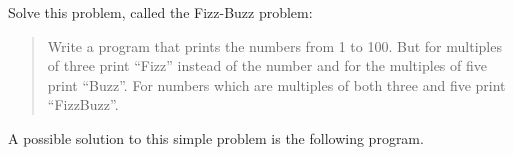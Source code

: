 \begin{Exercise}[title={FizzBuzz},difficulty=0]
\label{ex:fizzbuzz}
\Question \label{ex:fizzbuzz q1} Solve this problem, called
the Fizz-Buzz \cite{fizzbuzz} problem:
\begin{quote}
Write a program that prints the numbers from 1 to 100. But for multiples
of three print ``Fizz'' instead of the number and for the multiples of
five print ``Buzz''. For numbers which are multiples of both three and
five print ``FizzBuzz''.
\end{quote}
\end{Exercise}

\begin{Answer}
\Question A possible
solution to this simple problem is the following program.

\showremarks
\end{Answer}
